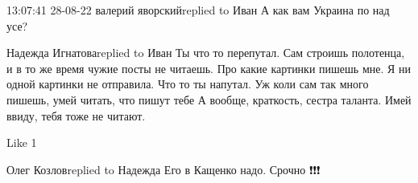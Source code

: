  
 
 
 
 

13:07:41 28-08-22
валерий яворскийreplied to Иван
А как вам Украина по над усе?

Надежда Игнатоваreplied to Иван
Ты что то перепутал. Сам строишь полотенца, и в то же время чужие посты не читаешь. Про какие картинки пишешь мне. Я ни одной картинки не отправила. Что то ты напутал. Уж коли сам так много пишешь, умей читать, что пишут тебе
А вообще, краткость, сестра таланта. Имей ввиду, тебя тоже не читают.

    Like 1

Олег Козловreplied to Надежда
Его в Кащенко надо. Срочно ❗❗❗
